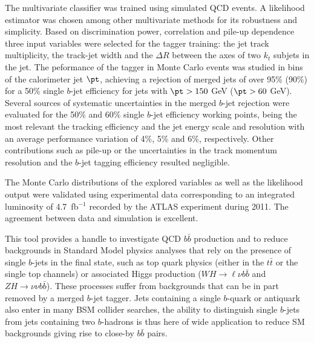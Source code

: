 The multivariate classifier was trained using simulated QCD events. A likelihood estimator was chosen among other multivariate methods for its robustness and simplicity.  Based on discrimination power, correlation and pile-up dependence three input variables were selected for the tagger training: the jet track multiplicity, the track-jet width and the $\Delta R$ between the axes of two $k_t$ subjets in the jet. 
 The peformance of the tagger in Monte Carlo events was studied in bins of the calorimeter jet $\pt$, achieving a rejection of merged jets of over 95\% (90\%) for a 50\% single $b$-jet efficiency for jets with $\pt>150$ GeV ($\pt>60$ GeV).
Several sources of systematic uncertainties in the merged $b$-jet rejection were evaluated for the 50\% and 60\% single $b$-jet efficiency working points, being the most relevant the tracking efficiency and the jet energy scale and resolution with an average performance variation of 4\%, 5\% and 6\%, respectively. Other contributions such as pile-up or the uncertainties in the track momentum resolution and the $b$-jet tagging efficiency resulted negligible.


The Monte Carlo distributions of the explored variables as well as the likelihood output were validated using experimental data corresponding to an integrated luminosity of 4.7~fb$^{-1}$ recorded by the ATLAS experiment during 2011. The agreement between data and simulation is excellent.


This tool provides a handle to investigate QCD $b\bar{b}$ production and to reduce backgrounds in %
 Standard Model physics analyses that rely on the presence of single $b$-jets in the final state, such as top quark physics (either in the $t\bar{t}$ or the single top channels) or associated Higgs production ($WH\rightarrow\ell\nu b\bar{b}$ and $ZH\rightarrow\nu\nu b\bar{b}$). These processes  suffer from backgrounds that can be in part removed by a merged $b$-jet tagger.
 Jets containing a single $b$-quark or antiquark %
also enter in many BSM collider searches, the ability to distinguish single $b$-jets from jets containing two $b$-hadrons is thus here of wide application to reduce SM backgrounds giving rise to close-by $b\bar{b}$ pairs.

